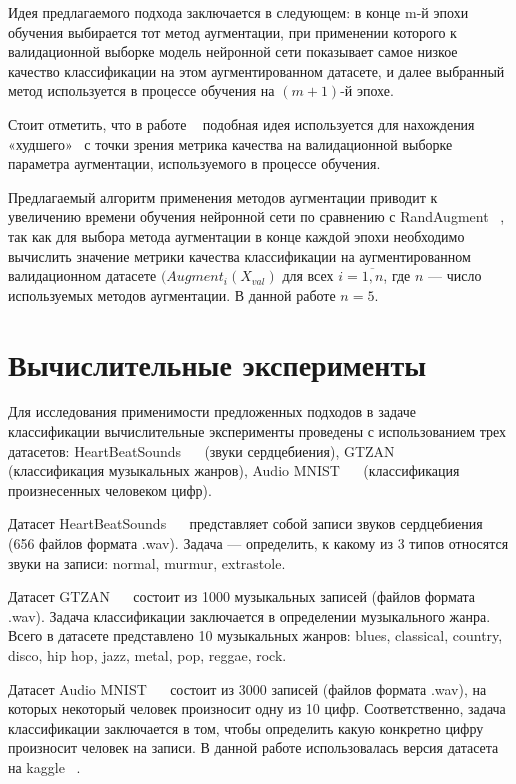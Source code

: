 \documentclass[12pt, fleqn]{article}
\begin{document}
Идея предлагаемого подхода заключается в следующем: в конце m-й эпохи обучения выбирается тот метод аугментации, при применении которого к валидационной выборке модель нейронной сети показывает самое низкое качество классификации на этом аугментированном датасете, и далее выбранный метод используется в процессе обучения на $(m + 1)$-й эпохе.

Стоит отметить, что в работе ~\cite{NearestAlgorithm} подобная идея используется для нахождения «худшего» \ с точки зрения метрика качества на валидационной выборке параметра аугментации, используемого в процессе обучения. 

Предлагаемый алгоритм применения методов аугментации приводит к увеличению времени обучения нейронной сети по сравнению с RandAugment ~\cite{RandAugment}, так как для выбора метода аугментации в конце каждой эпохи необходимо вычислить значение метрики качества классификации на аугментированном валидационном датасете $(Augment_i(X_{val})$ для всех $i = \overline{1,n}$, где $n$ --- число используемых методов аугментации. В данной работе $n = 5$.

\newpage
\section{Вычислительные эксперименты}
	
Для исследования применимости предложенных подходов в задаче классификации вычислительные эксперименты проведены с использованием трех датасетов: HeartBeatSounds ~\cite{HeartbeatSoundsArticle}~\cite{HeartbeatSoundsKaggle} (звуки сердцебиения), GTZAN ~\cite{GTZAN_Article}~\cite{GTZAN_kaggle} (классификация музыкальных жанров), Audio MNIST ~\cite{AudioMnistArticle}~\cite{AudioMnistKaggle} (классификация произнесенных человеком цифр).
	
Датасет HeartBeatSounds ~\cite{HeartbeatSoundsArticle}~\cite{HeartbeatSoundsKaggle} представляет собой записи звуков сердцебиения (656 файлов формата .wav). Задача --- определить, к какому из 3 типов относятся звуки на записи: normal, murmur, extrastole.  
	
Датасет GTZAN ~\cite{GTZAN_Article}~\cite{GTZAN_kaggle} состоит из 1000 музыкальных записей (файлов формата .wav). Задача классификации заключается в определении музыкального жанра. Всего в датасете представлено 10 музыкальных жанров: blues, classical, country, disco, hip hop, jazz, metal, pop, reggae, rock.

Датасет Audio MNIST ~\cite{AudioMnistArticle}~\cite{AudioMnistKaggle} состоит из 3000 записей (файлов формата .wav), на которых некоторый человек произносит одну из 10 цифр. Соответственно, задача классификации заключается в том, чтобы определить какую конкретно цифру произносит человек на записи. В данной работе использовалась версия датасета на kaggle ~\cite{AudioMnistKaggle}.
\end{document}
